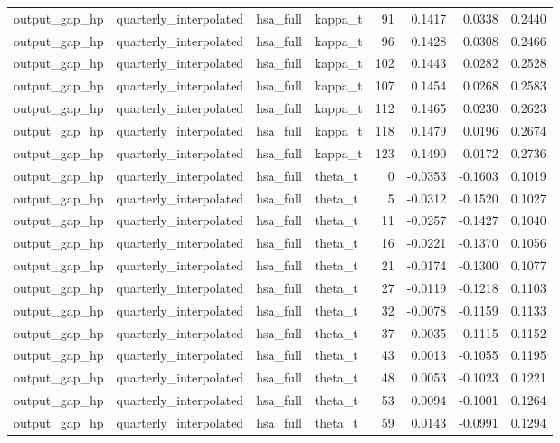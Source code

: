 \begin{tabular}{llllrrrr}
output\_gap\_hp & quarterly\_interpolated & hsa\_full & kappa\_t & 91 & 0.1417 & 0.0338 & 0.2440 \\
output\_gap\_hp & quarterly\_interpolated & hsa\_full & kappa\_t & 96 & 0.1428 & 0.0308 & 0.2466 \\
output\_gap\_hp & quarterly\_interpolated & hsa\_full & kappa\_t & 102 & 0.1443 & 0.0282 & 0.2528 \\
output\_gap\_hp & quarterly\_interpolated & hsa\_full & kappa\_t & 107 & 0.1454 & 0.0268 & 0.2583 \\
output\_gap\_hp & quarterly\_interpolated & hsa\_full & kappa\_t & 112 & 0.1465 & 0.0230 & 0.2623 \\
output\_gap\_hp & quarterly\_interpolated & hsa\_full & kappa\_t & 118 & 0.1479 & 0.0196 & 0.2674 \\
output\_gap\_hp & quarterly\_interpolated & hsa\_full & kappa\_t & 123 & 0.1490 & 0.0172 & 0.2736 \\
output\_gap\_hp & quarterly\_interpolated & hsa\_full & theta\_t & 0 & -0.0353 & -0.1603 & 0.1019 \\
output\_gap\_hp & quarterly\_interpolated & hsa\_full & theta\_t & 5 & -0.0312 & -0.1520 & 0.1027 \\
output\_gap\_hp & quarterly\_interpolated & hsa\_full & theta\_t & 11 & -0.0257 & -0.1427 & 0.1040 \\
output\_gap\_hp & quarterly\_interpolated & hsa\_full & theta\_t & 16 & -0.0221 & -0.1370 & 0.1056 \\
output\_gap\_hp & quarterly\_interpolated & hsa\_full & theta\_t & 21 & -0.0174 & -0.1300 & 0.1077 \\
output\_gap\_hp & quarterly\_interpolated & hsa\_full & theta\_t & 27 & -0.0119 & -0.1218 & 0.1103 \\
output\_gap\_hp & quarterly\_interpolated & hsa\_full & theta\_t & 32 & -0.0078 & -0.1159 & 0.1133 \\
output\_gap\_hp & quarterly\_interpolated & hsa\_full & theta\_t & 37 & -0.0035 & -0.1115 & 0.1152 \\
output\_gap\_hp & quarterly\_interpolated & hsa\_full & theta\_t & 43 & 0.0013 & -0.1055 & 0.1195 \\
output\_gap\_hp & quarterly\_interpolated & hsa\_full & theta\_t & 48 & 0.0053 & -0.1023 & 0.1221 \\
output\_gap\_hp & quarterly\_interpolated & hsa\_full & theta\_t & 53 & 0.0094 & -0.1001 & 0.1264 \\
output\_gap\_hp & quarterly\_interpolated & hsa\_full & theta\_t & 59 & 0.0143 & -0.0991 & 0.1294 \\

\end{tabular}
